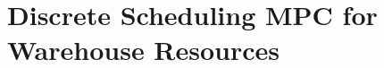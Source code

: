 \documentclass[a4paper,12pt]{report}
\begin{document}
\setcounter{chapter}{2}
\chapter{Discrete Scheduling MPC for Warehouse Resources}

\end{document}
